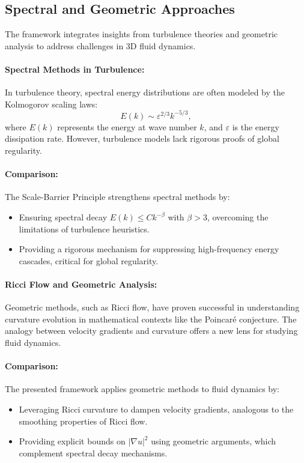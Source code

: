 \subsection{Spectral and Geometric Approaches}

The framework integrates insights from turbulence theories and geometric analysis to address challenges in 3D fluid dynamics.

\paragraph{Spectral Methods in Turbulence:}
In turbulence theory, spectral energy distributions are often modeled by the Kolmogorov scaling laws:
\begin{equation}
E(k) \sim \varepsilon^{2/3} k^{-5/3},
\end{equation}
where $E(k)$ represents the energy at wave number $k$, and $\varepsilon$ is the energy dissipation rate. However, turbulence models lack rigorous proofs of global regularity.

\paragraph{Comparison:}
The Scale-Barrier Principle strengthens spectral methods by:
\begin{itemize}
    \item Ensuring spectral decay $E(k) \leq C k^{-\beta}$ with $\beta > 3$, overcoming the limitations of turbulence heuristics.
    \item Providing a rigorous mechanism for suppressing high-frequency energy cascades, critical for global regularity.
\end{itemize}

\paragraph{Ricci Flow and Geometric Analysis:}
Geometric methods, such as Ricci flow, have proven successful in understanding curvature evolution in mathematical contexts like the Poincar\'e conjecture. The analogy between velocity gradients and curvature offers a new lens for studying fluid dynamics.

\paragraph{Comparison:}
The presented framework applies geometric methods to fluid dynamics by:
\begin{itemize}
    \item Leveraging Ricci curvature to dampen velocity gradients, analogous to the smoothing properties of Ricci flow.
    \item Providing explicit bounds on $|\nabla u|^2$ using geometric arguments, which complement spectral decay mechanisms.
\end{itemize}

